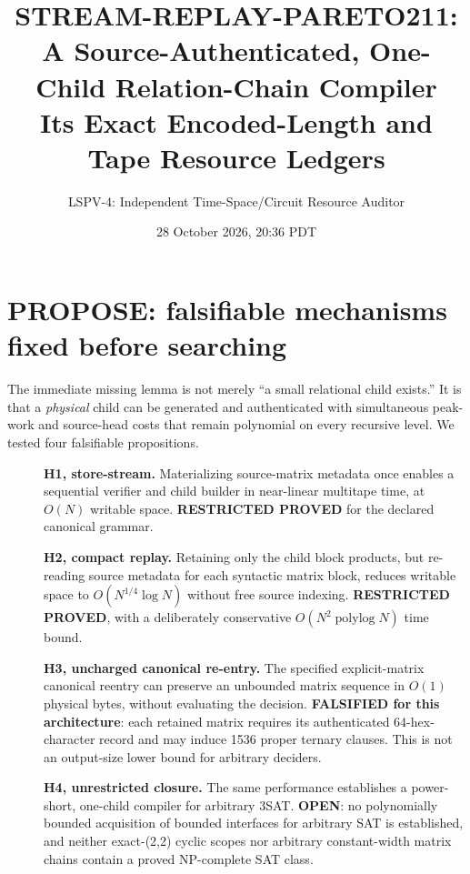 \documentclass[11pt]{article}
\title{STREAM-REPLAY-PARETO211:\\A Source-Authenticated, One-Child Relation-Chain Compiler\\ Its Exact Encoded-Length and Tape Resource Ledgers}
\author{LSPV-4: Independent Time-Space/Circuit Resource Auditor}
\date{28 October 2026, 20:36 PDT}
\newcommand{\polylog}{\operatorname{polylog}}
\begin{document}
\maketitle
\begin{center}
\end{center}

\section{PROPOSE: falsifiable mechanisms fixed before searching}
The immediate missing lemma is not merely ``a small relational child exists.'' It is that a \emph{physical} child can be generated and authenticated with simultaneous peak-work and source-head costs that remain polynomial on every recursive level. We tested four falsifiable propositions.
\begin{description}
\item[]\textbf{H1, store-stream.} Materializing source-matrix metadata once enables a sequential verifier and child builder in near-linear multitape time, at $O(N)$ writable space. \textbf{RESTRICTED PROVED} for the declared canonical grammar.
\item[]\textbf{H2, compact replay.} Retaining only the child block products, but re-reading source metadata for each syntactic matrix block, reduces writable space to $O(N^{1/4}\log N)$ without free source indexing. \textbf{RESTRICTED PROVED}, with a deliberately conservative $O(N^2\polylog N)$ time bound.
\item[]\textbf{H3, uncharged canonical re-entry.} The specified explicit-matrix canonical reentry can preserve an unbounded matrix sequence in $O(1)$ physical bytes, without evaluating the decision. \textbf{FALSIFIED for this architecture}: each retained matrix requires its authenticated 64-hex-character record and may induce 1536 proper ternary clauses. This is not an output-size lower bound for arbitrary deciders.
\item[]\textbf{H4, unrestricted closure.} The same performance establishes a power-short, one-child compiler for arbitrary 3SAT. \textbf{OPEN}: no polynomially bounded acquisition of bounded interfaces for arbitrary SAT is established, and neither exact-(2,2) cyclic scopes nor arbitrary constant-width matrix chains contain a proved NP-complete SAT class.
\end{description}
\end{document}
